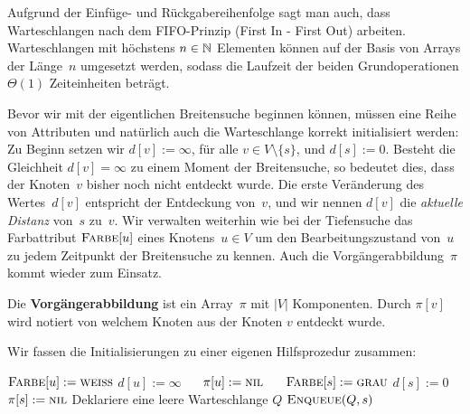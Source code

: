 \begin{bem}
Aufgrund der Einfüge- und Rückgabereihenfolge sagt man auch, dass Warteschlangen nach dem FIFO-Prinzip (First In - First Out) arbeiten.
Warteschlangen mit höchstens $n \in \mathbb{N}$ Elementen können auf der Basis von Arrays der Länge~$n$ umgesetzt werden, sodass die Laufzeit der beiden Grundoperationen $\Theta(1)$ Zeiteinheiten beträgt. 
\end{bem} 

\begin{bem} 
Bevor wir mit der eigentlichen Breitensuche beginnen können, müssen eine Reihe von Attributen und natürlich auch die Warteschlange korrekt initialisiert werden:
Zu Beginn setzen wir $d[v]:=\infty$, für alle $v \in V \setminus \{s\}$, und $d[s]:=0$.
Besteht die Gleichheit $d[v]=\infty$ zu einem Moment der Breitensuche, so bedeutet dies, dass der Knoten~$v$ bisher noch nicht entdeckt wurde.
Die erste Veränderung des Wertes~$d[v]$ entspricht der Entdeckung von~$v$, und wir nennen $d[v]$ die \emph{aktuelle Distanz} von~$s$ zu~$v$. 
Wir verwalten weiterhin wie bei der Tiefensuche das Farbattribut $\mathop{\text{\textsc{Farbe}}}[u]$ eines Knotens~$u \in V$ um den Bearbeitungszustand von~$u$ zu jedem Zeitpunkt der Breitensuche zu kennen.
Auch die Vorgängerabbildung~$\pi$ kommt wieder zum Einsatz.
\end{bem} 

\begin{defn}
	Die \textbf{Vorgängerabbildung} ist ein Array~$\pi$ mit $|V|$ Komponenten.
	Durch $\pi[v]$ wird notiert von welchem Knoten aus der Knoten $v$ entdeckt wurde.
\end{defn} 


\begin{bem} 
Wir fassen die Initialisierungen zu einer eigenen Hilfsprozedur zusammen:

\begin{algorithm}[H]
\caption{$\cc{Breitensuche-initialisieren}(D,s)$}
\begin{algorithmic}[1]
  \STATE $\mathop{\text{\textsc{Farbe}}}[u] := \mathop{\text{\textsc{weiss}}}$
  \STATE $d[u] := \infty$ $\quad$ 
  \STATE $\pi[u] := \mathop{\text{\textsc{nil}}}$ $\quad$ 
 \ENDFOR
 \STATE $\mathop{\text{\textsc{Farbe}}}[s] := \mathop{\text{\textsc{grau}}}$
 \STATE $d[s] := 0$
 \STATE $\pi[s] := \mathop{\text{\textsc{nil}}}$
 \STATE Deklariere eine leere Warteschlange $Q$
 \STATE $\mathop{\text{\textsc{Enqueue}}}(Q,s)$
\end{algorithmic}
\end{algorithm}
\end{bem}

